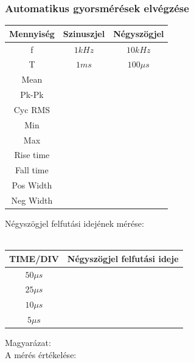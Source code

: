 \documentclass[10pt,a4paper]{article}
\begin{document}
			\subsubsection{Automatikus gyorsmérések elvégzése}
			\begin{tabular}{|c|c|c|}
			\hline 
			Mennyiség & Szinuszjel & Négyszögjel \\ 
			\hline 
			f & $1 kHz$ & $10 kHz$ \\ 
			\hline 
			T & $1 ms$ & $100 \mu s$ \\ 
			\hline 
			Mean & &  \\ 
			\hline 
			Pk-Pk &  &  \\ 
			\hline 
			Cyc RMS &  &  \\ 
			\hline 
			Min &  &  \\ 
			\hline 
			Max &  &  \\ 
			\hline 
			Rise time &  &  \\ 
			\hline 
			Fall time &  &  \\ 
			\hline 
			Pos Width &  &  \\ 
			\hline 
			Neg Width &  &  \\ 
			\hline 
			\end{tabular} 
			$$$$
			Négyszögjel felfutási idejének mérése:\\\\
			\begin{tabular}{|c|c|}
			\hline 
			TIME/DIV & Négyszögjel felfutási ideje \\ 
			\hline 
			$50 \mu s$ &  \\ 
			\hline 
			$25 \mu s$ &  \\ 
			\hline 
			$10 \mu s$ &  \\ 
			\hline 
			$5\mu s$ &  \\ 
			\hline 
			\end{tabular}
			
			$$$$
			Magyarázat:
			\newpage
			$$$$
			A mérés értékelése:
\end{document}
